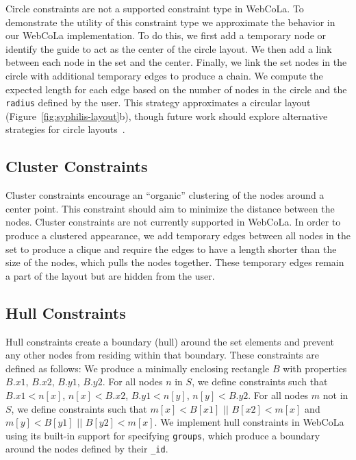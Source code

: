 Circle constraints are not a supported constraint type in WebCoLa. To
demonstrate the utility of this constraint type we approximate the behavior
in our WebCoLa implementation. To do this, we first add a temporary node
or identify the guide to act as the center of the circle layout.  We
then add a link between each
node in the set and the center. Finally, we link the set nodes in the circle
with additional temporary edges to produce a chain. We compute the expected
length for each edge based on the number of nodes in the circle and the 
\texttt{radius} defined by the user. This strategy approximates a circular
layout (Figure~\ref{fig:syphilis-layout}b), though future work should
explore alternative strategies for circle layouts~\cite{dwyer2009layout}.


\subsection{Cluster Constraints}
Cluster constraints encourage an ``organic'' clustering of the nodes around
a center point. This constraint should aim to minimize the distance between
the nodes. Cluster constraints are not currently supported in WebCoLa. In order to
produce a clustered appearance, we add temporary edges between all nodes
in the set to produce a clique and require the edges to have a length shorter
than the size of the nodes, which pulls the nodes together. These temporary edges
remain a part of the layout but are hidden from the user.

\subsection{Hull Constraints}
Hull constraints create a boundary (hull) around the set elements and 
prevent any other nodes from residing within that boundary. These 
constraints are defined as follows: We produce a minimally enclosing rectangle 
$B$ with properties $B.x1$, $B.x2$, $B.y1$, $B.y2$. For all nodes
$n$ in $S$, we define constraints such that $B.x1 < n[x]$,
\mbox{$n[x] < B.x2$},
$B.y1 < n[y]$, $n[y] < B.y2$. For all nodes $m$ not in $S$, we define
constraints such that $m[x] < B[x1]$ $||$ $B[x2] < m[x]$ and $m[y] < B[y1]$ $||$ $B[y2] < m[x]$.
We implement hull constraints in WebCoLa using its built-in support for 
specifying \texttt{groups}, which produce a boundary around 
the nodes defined by their \texttt{\_id}.

